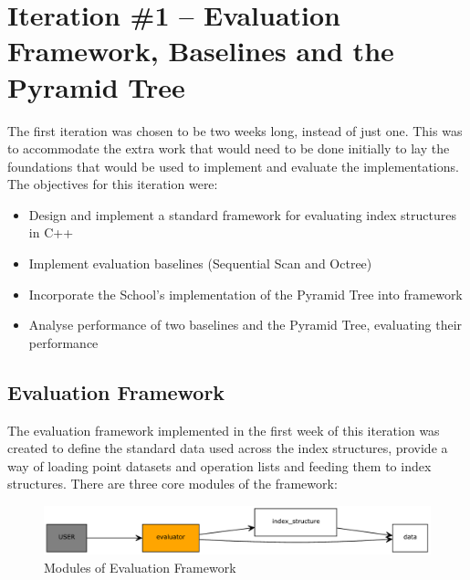 \section{Iteration \#1 -- Evaluation Framework, Baselines and the Pyramid Tree}

The first iteration was chosen to be two weeks long, instead of just one. This was to accommodate the extra work that would need to be done initially to lay the foundations that would be used to implement and evaluate the implementations. The objectives for this iteration were:
\begin{itemize}
	\item Design and implement a standard framework for evaluating index structures in C++
	\item Implement evaluation baselines (Sequential Scan and Octree)
	\item Incorporate the School's implementation of the Pyramid Tree into framework
	\item Analyse performance of two baselines and the Pyramid Tree, evaluating their performance
\end{itemize}


\subsection{Evaluation Framework}

The evaluation framework implemented in the first week of this iteration was created to define the standard data used across the index structures, provide a way of loading point datasets and operation lists and feeding them to index structures. There are three core modules of the framework:

\begin{figure}
	\vspace{-40pt}
	\begin{center}
		\includegraphics[scale=0.4]{figures/evaluation_framework.pdf}
	\end{center}
	\vspace{-20pt}
	\caption{Modules of Evaluation Framework}
	\label{fig:evaluation-framework}
\end{figure}


